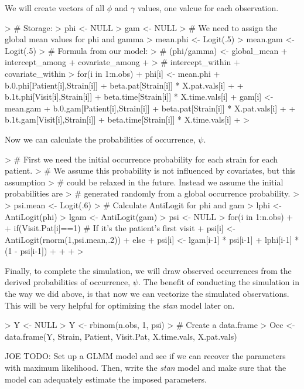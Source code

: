 \documentclass{article}
\begin{document}
We will create vectors of all $\phi$ and $\gamma$ values, one valcue for each observation. 
\begin{Schunk}
\begin{Sinput}
> # Storage:
> phi <- NULL
> gam <- NULL
> # We need to assign the global mean values for phi and gamma
> mean.phi <- Logit(.5)
> mean.gam <- Logit(.5)
> # Formula from our model:
> # (phi/gamma) <- global_mean + intercept_among + covariate_among + 
> #                     intercept_within + covariate_within
> for(i in 1:n.obs){
+   phi[i] <- mean.phi + b.0.phi[Patient[i],Strain[i]] + beta.pat[Strain[i]] * X.pat.vals[i] + 
+                 b.1t.phi[Visit[i],Strain[i]] + beta.time[Strain[i]] * X.time.vals[i]
+   gam[i] <- mean.gam + b.0.gam[Patient[i],Strain[i]] + beta.pat[Strain[i]] * X.pat.vals[i] + 
+                 b.1t.gam[Visit[i],Strain[i]] + beta.time[Strain[i]] * X.time.vals[i]
+ }
> 
\end{Sinput}
\end{Schunk}

Now we can calculate the probabilities of occurrence, $\psi$.
\begin{Schunk}
\begin{Sinput}
> # First we need the initial occurrence probability for each strain for each patient.
> # We assume this probability is not influenced by covariates, but this assumption
> # could be relaxed in the future. Instead we assume the initial probabilities are
> # generated randomly from a global occurrence probability.
> 
> psi.mean <- Logit(.6)
> # Calculate AntiLogit for phi and gam
> lphi <- AntiLogit(phi)
> lgam <- AntiLogit(gam)
> psi <- NULL
> for(i in 1:n.obs){
+   
+   if(Visit.Pat[i]==1){ # If it's the patient's first visit
+     psi[i] <- AntiLogit(rnorm(1,psi.mean,.2))
+   }else{
+     psi[i] <- lgam[i-1] * psi[i-1] + lphi[i-1] * (1 - psi[i-1]) 
+   }
+   
+ }
> 
\end{Sinput}
\end{Schunk}

Finally, to complete the simulation, we will draw observed occurrences from the derived probabilities of occurrence, $\psi$. The benefit of conducting the simulation in the way we did above, is that now we can vectorize the simulated observations. This will be very helpful for optimizing the \emph{stan} model later on.
\begin{Schunk}
\begin{Sinput}
> Y <- NULL
> Y <- rbinom(n.obs, 1, psi)
> # Create a data.frame
> Occ <- data.frame(Y, Strain, Patient, Visit.Pat, X.time.vals, X.pat.vals)
\end{Sinput}
\end{Schunk}

JOE TODO: Set up a GLMM model and see if we can recover the parameters with maximum likelihood. Then, write the \emph{stan} model and make sure that the model can adequately estimate the imposed parameters. 
\end{document}
